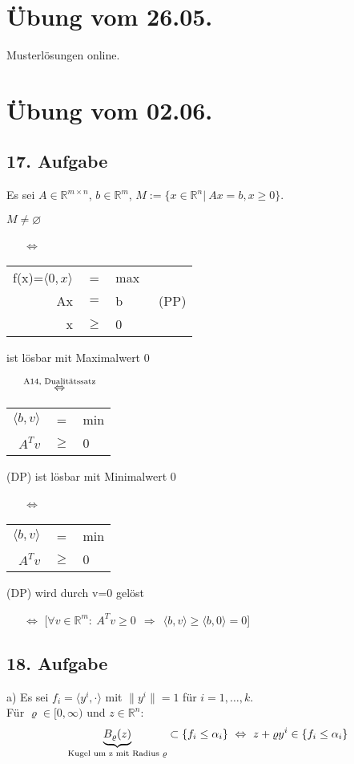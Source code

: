 \documentclass[a4paper,11pt,twoside,titlepage]{article}
\newcommand{\R}{{\mathbb R}}
\begin{document}
\section{Übung vom 26.05.}
Musterlösungen online.

\newpage
\section{Übung vom 02.06.}
\subsection*{17. Aufgabe}
Es sei $A\in\R^{m\times n}$, $b\in\R^m$, $M:=\{x\in\R^n|\:Ax=b,\!x\geq 0\}$.

$M\neq\varnothing$

~~~$\Leftrightarrow$ 
\begin{tabular}{|rcl|c}\cline{1-3}
f(x)=$\langle0,x\rangle$&=&max\\
Ax&$=$&b&~(PP)\\
x&$\geq$&0\\\cline{1-3}
\end{tabular} ist lösbar mit Maximalwert 0

~~~$\stackrel{\textnormal{\scriptsize{A14, Dualitätssatz}}}{\Leftrightarrow}$ 
\begin{tabular}{|rcl|}\hline
$\langle b,v\rangle$&=&min\\
$A^Tv$&$\geq$&0\\\hline
\end{tabular} (DP)    ist lösbar mit Minimalwert 0

~~~$\Leftrightarrow$ 
\begin{tabular}{|rcl|}\cline{1-3}
$\langle b,v\rangle$&=&min\\
$A^Tv$&$\geq$&0\\\hline
\end{tabular} (DP)    wird durch v=0 gelöst

~~~$\Leftrightarrow$ [$\forall v\in\R^m:\ A^Tv\geq0\ \ \Rightarrow\ \ \langle b,v\rangle\geq\langle b,0\rangle=0$]


\subsection*{18. Aufgabe}
a) Es sei $f_i=\langle y^i,\cdot\rangle$ mit $\|y^i\|=1$ für $i=1,\ldots,k$.\\
Für $\varrho\in[0,\infty)$ und $z\in\R^n$:
\[\underbrace{B_\varrho(z)}_{\textnormal{Kugel um z mit Radius \ensuremath{\varrho}}}\subset\{f_i\leq\alpha_i\}\ \Leftrightarrow\ z+\varrho y^i\in\{f_i\leq\alpha_i\}\]
\end{document}
